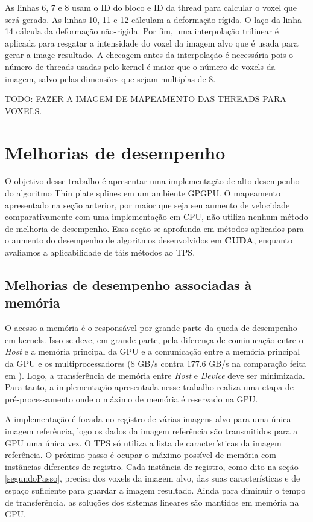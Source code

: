   As linhas 6, 7 e 8 usam o ID do bloco e ID da thread para calcular o voxel que será
gerado. As linhas 10, 11 e 12 cálculam a deformação rígida. O laço da linha 14
cálcula da deformação não-rigida. Por fim, uma interpolação trilinear é aplicada
para resgatar a intensidade do voxel da imagem alvo que é usada para gerar a image
resultado. A checagem antes da interpolação é necessária pois o número de threads
usadas pelo kernel é maior que o número de voxels da imagem, salvo pelas dimensões
que sejam multiplas de 8.

  TODO: FAZER A IMAGEM DE MAPEAMENTO DAS THREADS PARA VOXELS.

\section{Melhorias de desempenho}

  O objetivo desse trabalho é apresentar uma implementação de alto desempenho
do algoritmo Thin plate splines em um ambiente GPGPU. O mapeamento apresentado
na seção anterior, por maior que seja seu aumento de velocidade comparativamente
com uma implementação em CPU, não utiliza nenhum método de melhoria de desempenho.
Essa seção se aprofunda em métodos aplicados para o aumento do desempenho de
algoritmos desenvolvidos em \textbf{CUDA}, enquanto avaliamos a aplicabilidade
de táis métodos ao TPS.

\subsection{Melhorias de desempenho associadas à memória}

  O acesso a memória é o responsável por grande parte da queda de desempenho
em kernels. Isso se deve, em grande parte, pela diferença de cominucação entre o
\textit{Host} e a memória principal da GPU e a comunicação entre a memória
principal da GPU e os multiprocessadores
(8 GB/s contra 177.6 GB/s na comparação feita em \cite{cudaBestPractices}). Logo,
a transferência de memória entre \textit{Host} e \textit{Device} deve ser
minimizada. Para tanto, a implementação apresentada nesse trabalho realiza uma
etapa de pré-processamento onde o máximo de memória é reservado na GPU.

  A implementação é focada no registro de várias imagens alvo para uma única
imagem referência, logo os dados da imagem referência são transmitidos para a
GPU uma única vez. O TPS só utiliza a lista de características da imagem referência.
O próximo passo é ocupar o máximo possível de memória com instâncias diferentes
de registro. Cada instância de registro, como dito na seção \ref{segundoPasso},
precisa dos voxels da imagem alvo, das suas características e de espaço suficiente
para guardar a imagem resultado. Ainda para diminuir o tempo de transferência,
as soluções dos sistemas lineares são mantidos em memória na GPU.

